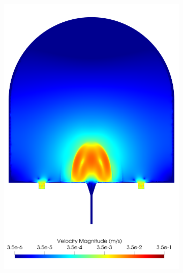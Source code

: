 \begin{figure}
\begin{subfigure}[b]{0.45\textwidth}
            \includegraphics[width=\textwidth]{diagrams/results-modelling/velocity-comparison/meshandsoln_dg_velocity_placentone_24_velocity-log.png}
            \caption{}
            \label{fig:4-models-placentone-norm-log:24}
        \end{subfigure}
        \hfill
        \begin{subfigure}[b]{0.45\textwidth}
            \centering

\end{subfigure}
\end{figure}
